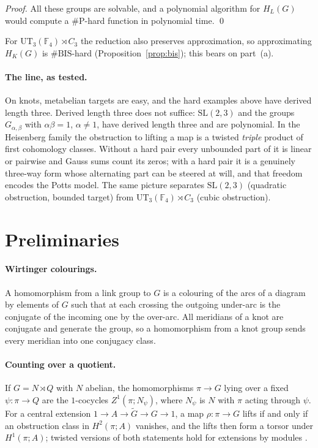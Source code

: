 \documentclass[11pt]{article}
\theoremstyle{definition}
\theoremstyle{remark}
\newcommand{\F}{\mathbb{F}}
\newcommand{\sharpP}{\#\mathrm{P}}
\begin{document}
\noindent\emph{Proof.} All these groups are solvable, and a polynomial
algorithm for $H_L(G)$ would compute a $\sharpP$-hard function in
polynomial time. \qed

\smallskip
For $\mathrm{UT}_3(\F_4)\rtimes C_3$ the reduction also preserves
approximation, so approximating $H_K(G)$ is $\#\mathrm{BIS}$-hard
(Proposition~\ref{prop:bis}); this bears on part~(a).

\paragraph{The line, as tested.} On knots, metabelian targets are easy, and
the hard examples above have derived length three. Derived length three does
not suffice: $\mathrm{SL}(2,3)$ and the groups $G_{\alpha,\beta}$ with
$\alpha\beta=1$, $\alpha\ne1$, have derived length three and are polynomial.
In the Heisenberg family the obstruction to lifting a map is a twisted
\emph{triple} product of first cohomology classes. Without a hard pair every
unbounded part of it is linear or pairwise and Gauss sums count its zeros;
with a hard pair it is a genuinely three-way form whose alternating part can be
steered at will, and that freedom encodes the Potts model. The same picture
separates $\mathrm{SL}(2,3)$ (quadratic obstruction, bounded target) from
$\mathrm{UT}_3(\F_4)\rtimes C_3$ (cubic obstruction).

\section{Preliminaries}\label{sec:prelim}

\paragraph{Wirtinger colourings.} A homomorphism from a link group to $G$ is a
colouring of the arcs of a diagram by elements of $G$ such that at each
crossing the outgoing under-arc is the conjugate of the incoming one by the
over-arc. All meridians of a knot are conjugate and generate the group, so a
homomorphism from a knot group sends every meridian into one conjugacy class.

\paragraph{Counting over a quotient.} If $G=N\rtimes Q$ with $N$ abelian, the
homomorphisms $\pi\to G$ lying over a fixed $\psi\colon\pi\to Q$ are the
$1$-cocycles $Z^1(\pi;N_\psi)$, where $N_\psi$ is $N$ with $\pi$ acting through
$\psi$. For a central extension $1\to A\to\tilde G\to G\to1$, a map
$\rho\colon\pi\to G$ lifts if and only if an obstruction class in
$H^2(\pi;A)$ vanishes, and the lifts then form a torsor under $H^1(\pi;A)$;
twisted versions of both statements hold for extensions by modules
\cite{MS05}.
\end{document}

